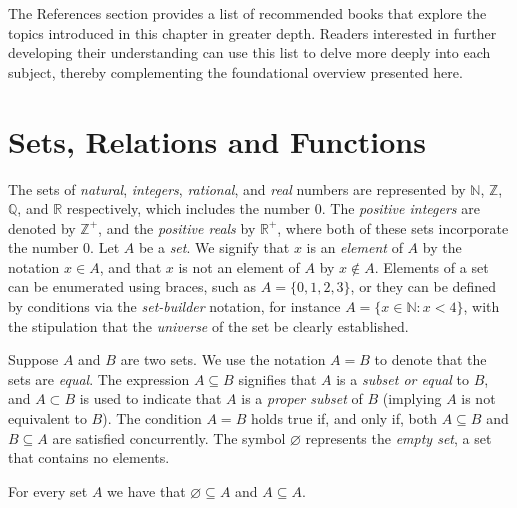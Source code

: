 The References section provides a list of recommended books that explore the topics introduced in this chapter in greater depth. Readers interested in further developing their understanding can use this list to delve more deeply into each subject, thereby complementing the foundational overview presented here.

%
%

\section{Sets, Relations and Functions}
\label{sec:sets}

The sets of \emph{natural}, \emph{integers}, \emph{rational}, and \emph{real} numbers are represented by $\mathbb{N}$, $\mathbb{Z}$, $\mathbb{Q}$, and $\mathbb{R}$ respectively, which includes the number $0$. The \emph{positive integers} are denoted by $\mathbb{Z}^+$, and the \emph{positive reals} by $\mathbb{R}^+$, where both of these sets incorporate the number $0$. Let $A$ be a \emph{set}. We signify that $x$ is an \emph{element} of $A$ by the notation $x\in A$, and that $x$ is not an element of $A$ by $x \notin A$. Elements of a set can be enumerated using braces, such as $A = \{0, 1, 2, 3\}$, or they can be defined by conditions via the \emph{set-builder} notation, for instance $A = \{x \in \mathbb{N} : x < 4\}$, with the stipulation that the \emph{universe} of the set be clearly established.

Suppose $A$ and $B$ are two sets. We use the notation $A = B$ to denote that the sets are \emph{equal}. The expression $A \subseteq B$ signifies that $A$ is a \emph{subset or equal} to $B$, and $A \subset B$ is used to indicate that $A$ is a \emph{proper subset} of $B$ (implying $A$ is not equivalent to $B$). The condition $A = B$ holds true if, and only if, both $A \subseteq B$ and $B \subseteq A$ are satisfied concurrently. The symbol $\varnothing$ represents the \emph{empty set}, a set that contains no elements.

\begin{example}
For every set $A$ we have that $\varnothing \subseteq A$ and $ A \subseteq A$.
\end{example}

